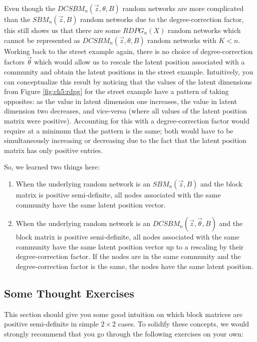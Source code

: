  Even though the $DCSBM_n(\vec z, \theta, B)$ random networks are more complicated than the $SBM_n(\vec z, B)$ random networks due to the degree-correction factor, this still shows us that there are some $RDPG_n(X)$ random networks which cannot be represented as $DCSBM_n(\vec z, \theta, B)$ random networks with $K < n$. Working back to the street example again, there is no choice of degree-correction factors $\vec \theta$ which would allow us to rescale the latent position associated with a community and obtain the latent positions in the street example. Intuitively, you can conceptualize this result by noticing that the values of the latent dimensions from Figure \ref{fig:ch5:rdpg} for the street example have a pattern of taking opposites: as the value in latent dimension one increases, the value in latent dimension two decreases, and vice-versa (where all values of the latent position matrix were positive). Accounting for this with a degree-correction factor would require at a minimum that the pattern is the same; both would have to be simultaneously increasing or decreasing due to the fact that the latent position matrix has only positive entries.
 
So, we learned two things here:
\begin{enumerate}
    \item When the underlying random network is an $SBM_n(\vec z, B)$ and the block matrix is positive semi-definite, all nodes associated with the same community have the same latent position vector.
    \item When the underlying random network is an $DCSBM_n(\vec z, \vec \theta, B)$ and the block matrix is positive semi-definite, all nodes associated with the same community have the same latent position vector up to a rescaling by their degree-correction factor. If the nodes are in the same community and the degree-correction factor is the same, the nodes have the same latent position.
\end{enumerate}

\subsection{Some Thought Exercises}

This section should give you some good intuition on which block matrices are positive semi-definite in simple $2 \times 2$ cases. To solidify these concepts, we would strongly recommend that you go through the following exercises on your own:

